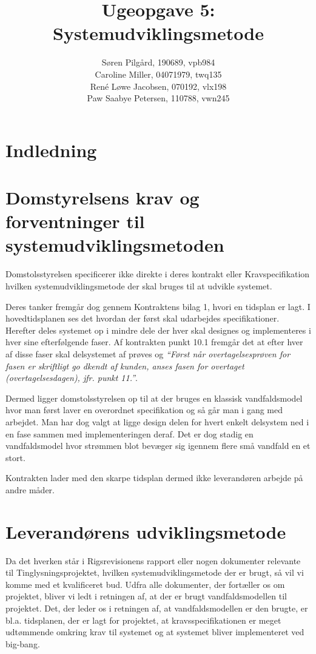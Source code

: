 \documentclass[10pt,a4paper,danish]{article}
\title{Ugeopgave 5: Systemudviklingsmetode}
\author{Søren Pilgård, 190689, vpb984\\
Caroline Miller, 04071979, twq135\\
René Løwe Jacobsen, 070192, vlx198\\
Paw Saabye Petersen, 110788, vwn245}
\begin{document}
\maketitle
\newpage


\section{Indledning}



\section{Domstyrelsens krav og forventninger til systemudviklingsmetoden}
Domstolsstyrelsen specificerer ikke direkte i deres kontrakt\cite{Kontrakt}
eller Kravspecifikation\cite{Krav} hvilken systemudviklingsmetode der skal
bruges til at udvikle systemet.

Deres tanker fremgår dog gennem Kontraktens bilag 1\cite{Tid}, hvori en tidsplan
er lagt.
I hovedtidsplanen ses det hvordan der først skal udarbejdes specifikationer.
Herefter deles systemet op i mindre dele der hver skal designes og implementeres
i hver sine efterfølgende faser. Af kontrakten punkt 10.1
fremgår det at efter hver af disse faser skal delsystemet af prøves og \textit{``Først når overtagelsesprøven for fasen er skriftligt go dkendt af kunden, anses
  fasen for overtaget (overtagelsesdagen), jfr. punkt 11.''}\cite[s.~16]{Kontrakt}.

Dermed ligger domstolsstyrelsen op til at der bruges en klassisk vandfaldsmodel
hvor man først laver en overordnet specifikation og så går man i gang med
arbejdet. Man har dog valgt at ligge design delen for hvert enkelt delsystem ned
i en fase sammen med implementeringen deraf. Det er dog stadig en vandfaldsmodel
hvor strømmen blot bevæger sig igennem flere små vandfald en et stort.


Kontrakten lader med den skarpe tidsplan dermed ikke leverandøren arbejde på
andre måder.

\section{Leverandørens udviklingsmetode}
Da det hverken står i Rigsrevisionens rapport eller nogen dokumenter relevante til Tinglysningsprojektet, hvilken systemudviklingsmetode der er brugt, så vil vi komme med et kvalificeret bud.
Udfra alle dokumenter, der fortæller os om projektet, bliver vi ledt i retningen af, at der er brugt vandfaldsmodellen til projektet.
Det, der leder os i retningen af, at vandfaldsmodellen er den brugte, er bl.a. tidsplanen, der er lagt for projektet, at kravsspecifikationen er meget udtømmende omkring krav til systemet og
at systemet bliver implementeret ved big-bang.
\end{document}
